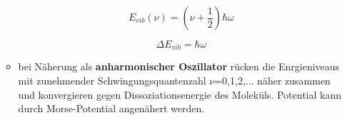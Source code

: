 \begin{itemize}
\begin{itemize}
                \begin{equation}
                    E_{vib}(\nu)=(\nu+\frac{1}{2})\hbar \omega
                \label{EVib_harmonisch}
                \end{equation}

                \begin{equation}
                \Delta E_{vib}=\hbar \omega
                \label{EVib_Abstaende}
                \end{equation}

            \item bei Näherung als \textbf{anharmonischer Oszillator} rücken die Enrgieniveaus mit zunehmender Schwingungsquantenzahl $\nu$=0,1,2,... näher zusammen und konvergieren gegen Dissoziationsenergie des Moleküls. Potential kann durch Morse-Potential angenähert werden.
        \end{itemize}

\end{itemize}


